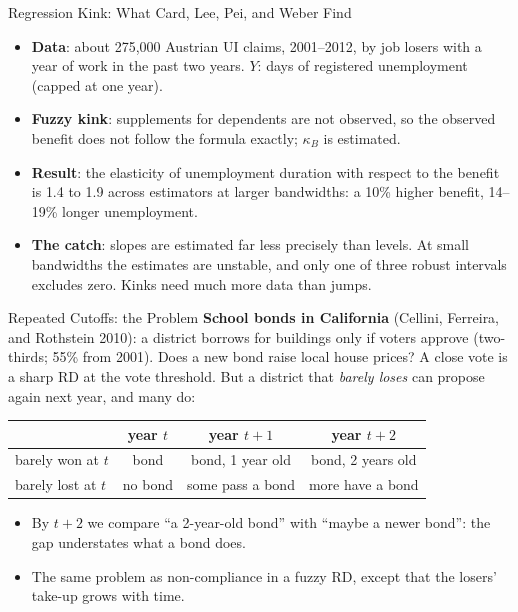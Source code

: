 \documentclass[aspectratio=169,11pt,xcolor=dvipsnames]{beamer}
\newcommand{\srcp}[1]{{\scriptsize\color{gray}(#1)}}
\begin{document}
\begin{frame}{Regression Kink: What Card, Lee, Pei, and Weber Find}
\begin{itemize}\itemsep4pt
  \item \textbf{Data}: about 275,000 Austrian UI claims, 2001--2012, by job losers with a
        year of work in the past two years. $Y$: days of registered unemployment
        (capped at one year).
  \item \textbf{Fuzzy kink}: supplements for dependents are not observed, so the
        observed benefit does not follow the formula exactly; $\kappa_B$ is estimated.
  \item \textbf{Result}: the elasticity of unemployment duration with respect to the
        benefit is \alert{1.4 to 1.9} across estimators at larger bandwidths: a 10\%
        higher benefit, 14--19\% longer unemployment.
  \item \textbf{The catch}: slopes are estimated far less precisely than levels. At
        small bandwidths the estimates are unstable, and only one of three robust
        intervals excludes zero. Kinks need much more data than jumps.
\end{itemize}
\end{frame}

\begin{frame}{Repeated Cutoffs: the Problem}
\textbf{School bonds in California} \srcp{Cellini, Ferreira, and Rothstein 2010}: a
district borrows for buildings only if voters approve (two-thirds; 55\% from
2001). Does a new bond raise local house prices?
\vskip3pt
A close vote is a sharp RD at the vote threshold. But a district that \emph{barely
loses} can propose again next year, and many do:
\vskip3pt
\begin{center}\small
\renewcommand{\arraystretch}{1.15}
\begin{tabular}{@{}lccc@{}}
\toprule
 & year $t$ & year $t+1$ & year $t+2$ \\
\midrule
barely won at $t$ & bond & bond, 1 year old & bond, 2 years old \\
barely lost at $t$ & no bond & some pass a bond & more have a bond \\
\bottomrule
\end{tabular}
\end{center}
\vskip3pt
\begin{itemize}\itemsep2pt
  \item By $t+2$ we compare ``a 2-year-old bond'' with ``maybe a newer bond'':
        the gap understates what a bond does.
  \item The same problem as non-compliance in a fuzzy RD, except that the
        losers' take-up grows with time.
\end{itemize}
\end{frame}
\end{document}

